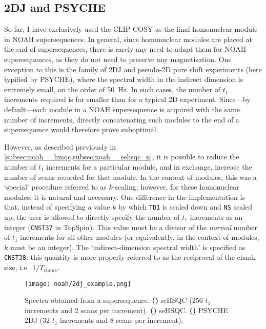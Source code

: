 \subsection{2DJ and PSYCHE}
\label{subsec:noah__2djpsyche}

So far, I have exclusively used the CLIP-COSY as the final homonuclear module in NOAH supersequences.
In general, since homonuclear modules are placed at the end of supersequences, there is rarely any need to adapt them for NOAH supersequences, as they do not need to preserve any magnetisation.
One exception to this is the family of 2DJ and pseudo-2D pure shift experiments (here typified by PSYCHE), where the spectral width in the indirect dimension is extremely small, on the order of \qty{50}{\Hz}.
In such cases, the number of $t_1$ increments required is far smaller than for a typical 2D experiment.
Since---by default---each module in a NOAH supersequence is acquired with the same number of increments, directly concatenating such modules to the end of a supersequence would therefore prove suboptimal.

However, as described previously in \cref{subsec:noah__hmqc,subsec:noah__sehsqc_n}, it is possible to reduce the number of $t_1$ increments for a particular module, and in exchange, increase the number of scans recorded for that module.
In the context of \nitrogen{} modules, this was a `special' procedure referred to as $k$-scaling; however, for these homonuclear modules, it is natural and necessary.
One difference in the implementation is that, instead of specifying a value $k$ by which \texttt{TD1} is scaled down and \texttt{NS} scaled up, the user is allowed to directly specify the number of $t_1$ increments as an integer (\texttt{CNST37} in TopSpin).
This value must be a divisor of the \textit{normal} number of $t_1$ increments for all other modules (or equivalently, in the context of \nitrogen{} modules, $k$ must be an integer).
The `indirect-dimension spectral width' is specified as \texttt{CNST38}: this quantity is more properly referred to as the reciprocal of the chunk size, i.e.\ $1/T_\text{chunk}$.

\begin{figure}[!ht]
    \centering
    \texttt{[image: noah/2dj\_example.png]}%
    {\label{fig:2dj_example_spn}}%
    {\label{fig:2dj_example_spc}}%
    {\label{fig:2dj_example_j}}%
    \caption[Spectra from a  supersequence]{
        Spectra obtained from a  supersequence.
        \textbf{()} \nitrogen{} seHSQC (256 $t_1$ increments and 2 scans per increment).
        \textbf{()} \carbon{} seHSQC.
        \textbf{()} PSYCHE 2DJ (32 $t_1$ increments and 8 scans per increment).
    }
    \label{fig:2dj_example}
\end{figure}

